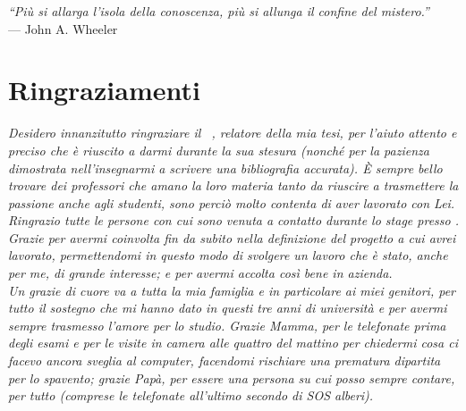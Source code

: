 
\cleardoublepage
{}
{}

\begin{flushright}{
	\slshape    
	``Più si allarga l'isola della conoscenza, più si allunga il confine del mistero.''} \\ 
	\medskip
    --- John A. Wheeler
\end{flushright}


\bigskip

\begingroup
\let\clearpage\relax
\let\cleardoublepage\relax
\let\cleardoublepage\relax

\chapter*{Ringraziamenti}

\noindent \textit{Desidero innanzitutto ringraziare il \profTitle\ \myProf, relatore della mia tesi, per l'aiuto attento e preciso che è riuscito a darmi durante la sua stesura (nonché per la pazienza dimostrata nell'insegnarmi a scrivere una bibliografia accurata). È sempre bello trovare dei professori che amano la loro materia tanto da riuscire a trasmettere la passione anche agli studenti, sono perciò molto contenta di aver lavorato con Lei.}\\

\noindent \textit{Ringrazio tutte le persone con cui sono venuta a contatto durante lo stage presso \TS. Grazie per avermi coinvolta fin da subito nella definizione del progetto a cui avrei lavorato, permettendomi in questo modo di svolgere un lavoro che è stato, anche per me, di grande interesse; e per avermi accolta così bene in azienda.}\\

\noindent \textit{Un grazie di cuore va a tutta la mia famiglia e in particolare ai miei genitori, per tutto il sostegno che mi hanno dato in questi tre anni di università e per avermi sempre trasmesso l'amore per lo studio. Grazie Mamma, per le telefonate prima degli esami e per le visite in camera alle quattro del mattino per chiedermi cosa ci facevo ancora sveglia al computer, facendomi rischiare una prematura dipartita per lo spavento; grazie Papà, per essere una persona su cui posso sempre contare, per tutto (comprese le telefonate all'ultimo secondo di SOS alberi).}\\


